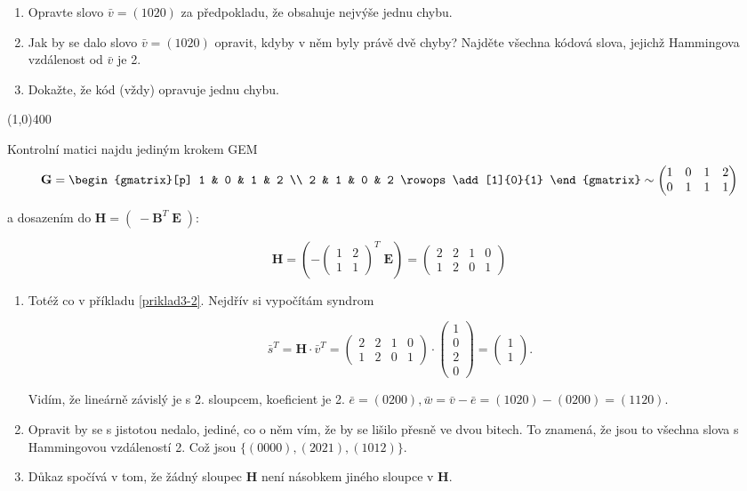 \documentclass{article}
\begin{document}
\begin{enumerate}
	\item Opravte slovo $\bar{v} = (1020)$ za předpokladu, že obsahuje nejvýše jednu chybu.
	\item Jak by se dalo slovo $\bar{v} = (1020)$ opravit, kdyby v něm byly právě dvě chyby? Najděte všechna kódová slova, jejichž Hammingova vzdálenost od $\bar{v}$ je 2.
	\item Dokažte, že kód (vždy) opravuje jednu chybu.
\end{enumerate}

\line(1,0){400}

Kontrolní matici najdu jediným krokem GEM
\[ \mathbf{G} = 
	\begin{gmatrix}[p]
		1 & 0 & 1 & 2 \\
  	2 & 1 & 0 & 2
	  \rowops
		\add[1]{0}{1}
	\end{gmatrix} \sim
	\begin{pmatrix}
  1 & 0 & 1 & 2 \\
  0 & 1 & 1 & 1
\end{pmatrix} \]

a dosazením do $\mathbf{H} = (\;-\mathbf{B}^T\; \mathbf{E}\;)$:

\[ \mathbf{H} = \left( -\begin{pmatrix}
   1 & 2 \\
   1 & 1
\end{pmatrix}^T  \;\mathbf{E}\right) = 
\begin{pmatrix}
   2 & 2 & 1 & 0 \\
   1 & 2 & 0 & 1
\end{pmatrix}
\]

\begin{enumerate}
	\item Totéž co v příkladu \ref{priklad3-2}. Nejdřív si vypočítám syndrom
	
	\[ \bar{s}^T = \mathbf{H}\cdot\bar{v}^T = 
	\begin{pmatrix}
		2 & 2 & 1 & 0 \\
	  1 & 2 & 0 & 1
	\end{pmatrix}\cdot
	\begin{pmatrix}
		1\\
	  0\\
	  2\\
	  0
	\end{pmatrix} =  
	\begin{pmatrix}
		1\\
	  1
	\end{pmatrix}. \]
	
	Vidím, že lineárně závislý je s 2. sloupcem, koeficient je 2. $\bar{e} = (0200), \bar{w} = \bar{v} - \bar{e} = (1020) - (0200) = (1120)$.

	\item Opravit by se s jistotou nedalo, jediné, co o něm vím, že by se lišilo přesně ve dvou bitech. To znamená, že jsou to všechna slova s Hammingovou vzdáleností 2. Což jsou $\{(0000),(2021),(1012)\}$.
	\item Důkaz spočívá v tom, že žádný sloupec $\mathbf{H}$ není násobkem jiného sloupce v $\mathbf{H}$.
		
\end{enumerate}
\end{document}

